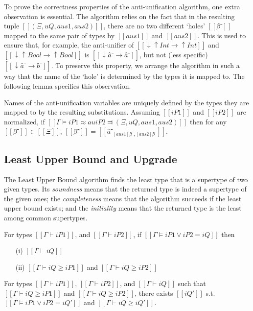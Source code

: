 To prove the correctness properties of the anti-unification algorithm,
one extra observation is essential. The algorithm relies on the fact that
in the resulting tuple $[[(Ξ, uQ, aus1, aus2)]]$,
there are no two different `holes' $[[β̂⁻]]$
mapped to the same pair of types by $[[aus1]]$ and $[[aus2]]$.
This is used to ensure that, for example, 
the anti-unifier of $[[↓↑Int → ↑Int]]$ and 
$[[↓↑Bool → ↑Bool]]$ is $[[↓â⁻ → â⁻]]$, but not
(less specific) $[[↓â⁻ → b̂⁻]]$.
To preserve this property, we arrange the algorithm in such a way 
that the name of the `hole' is determined by the types it is mapped to.
The following lemma specifies this observation.

\begin{lemma*}
    Names of the anti-unification variables are uniquely defined by
    the types they are mapped to by the resulting substitutions. 
    Assuming $[[iP1]]$ and $[[iP2]]$ are normalized,
        if $[[Γ ⊨ iP1 ≈au iP2 ⫤ (Ξ, uQ, aus1, aus2)]]$
        then for any $[[β̂⁻]] \in [[Ξ]]$,
        $[[β̂⁻]] = [[â⁻_{[aus1]β̂⁻, [aus2]β̂⁻}]]$.
\end{lemma*}

\subsection{Least Upper Bound and Upgrade}
\label{sec:proof-lub-upgrade}

    The Least Upper Bound algorithm finds the least type that is a supertype of two given types.
    Its \emph{soundness} means that the returned type is indeed a supertype of the given ones;
    the \emph{completeness} means that the algorithm succeeds if the least upper bound exists;
    and the \emph{initiality} means that the returned type is the least among common supertypes. 

    \begin{lemma*}
        For types $[[Γ ⊢ iP1]]$, and $[[Γ ⊢ iP2]]$,
        if $[[Γ ⊨ iP1 ∨ iP2 = iQ]]$ then
        \begin{enumerate}
            \item[(i)]  $[[Γ ⊢ iQ]]$
            \item[(ii)] $[[Γ ⊢ iQ ≥ iP1]]$ and $[[Γ ⊢ iQ ≥ iP2]]$
        \end{enumerate}
    \end{lemma*}


    \begin{lemma*}
        For types $[[Γ ⊢ iP1]]$, $[[Γ ⊢ iP2]]$, and $[[Γ ⊢ iQ]]$
        such that $[[Γ ⊢ iQ ≥ iP1]]$ and $[[Γ ⊢ iQ ≥ iP2]]$,
        there exists $[[iQ']]$ s.t. $[[Γ ⊨ iP1 ∨ iP2 = iQ']]$ 
        and $[[Γ ⊢ iQ ≥ iQ']]$.
    \end{lemma*}

